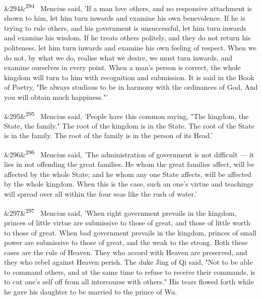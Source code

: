 \documentclass[12pt]{article}
\newcommand{\para}[1][]{\par\noindent\ifx&#1&\else\textsuperscript{\footnotesize #1}~\fi}
\begin{document}
\para[294] Mencius said, 'If a man love others, and no responsive attachment is shown to him, let him turn inwards and examine his own benevolence. If he is trying to rule others, and his government is unsuccessful, let him turn inwards and examine his wisdom. If he treats others politely, and they do not return his politeness, let him turn inwards and examine his own feeling of respect. When we do not, by what we do, realise what we desire, we must turn inwards, and examine ourselves in every point. When a man's person is correct, the whole kingdom will turn to him with recognition and submission. It is said in the Book of Poetry, "Be always studious to be in harmony with the ordinances of God, And you will obtain much happiness."'

\para[295] Mencius said, 'People have this common saying, "The kingdom, the State, the family." The root of the kingdom is in the State. The root of the State is in the family. The root of the family is in the person of its Head.'

\para[296] Mencius said, 'The administration of government is not difficult --- it lies in not offending the great families. He whom the great families affect, will be affected by the whole State; and he whom any one State affects, will be affected by the whole kingdom. When this is the case, such an one's virtue and teachings will spread over all within the four seas like the rush of water.'

\para[297] Mencius said, 'When right government prevails in the kingdom, princes of little virtue are submissive to those of great, and those of little worth to those of great. When bad government prevails in the kingdom, princes of small power are submissive to those of great, and the weak to the strong. Both these cases are the rule of Heaven. They who accord with Heaven are preserved, and they who rebel against Heaven perish. The duke Jing of Qi said, "Not to be able to command others, and at the same time to refuse to receive their commands, is to cut one's self off from all intercourse with others." His tears flowed forth while he gave his daughter to be married to the prince of Wu.
\end{document}
